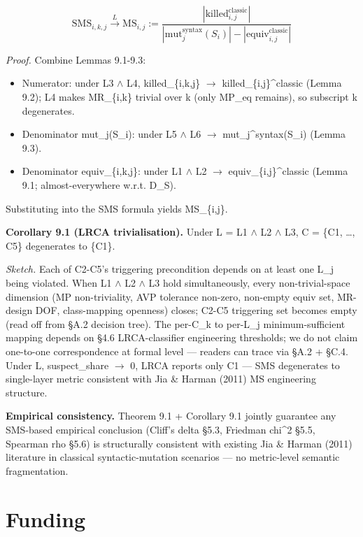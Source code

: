 \documentclass[review,12pt,authoryear]{elsarticle}
\providecommand{\tightlist}{\setlength{\itemsep}{0pt}\setlength{\parskip}{0pt}}
\begin{document}
\[ \mathrm{SMS}_{i,k,j} \xrightarrow{L} \mathrm{MS}_{i,j} := \frac{|\mathrm{killed}_{i,j}^{\mathrm{classic}}|}{|\mathrm{mut}_j^{\mathrm{syntax}}(S_i)| - |\mathrm{equiv}_{i,j}^{\mathrm{classic}}|} \]

\emph{Proof.} Combine Lemmas 9.1-9.3:

\begin{itemize}
\tightlist
\item
  Numerator: under L3 $\wedge$ L4, killed\_\{i,k,j\} $\to$
  killed\_\{i,j\}\^{}classic (Lemma 9.2); L4 makes MR\_\{i,k\} trivial
  over k (only MP\_eq remains), so subscript k degenerates.
\item
  Denominator \textbar mut\_j(S\_i)\textbar: under L5 $\wedge$ L6 $\to$
  \textbar mut\_j\^{}syntax(S\_i)\textbar{} (Lemma 9.3).
\item
  Denominator \textbar equiv\_\{i,k,j\}\textbar: under L1 $\wedge$ L2 $\to$
  \textbar equiv\_\{i,j\}\^{}classic\textbar{} (Lemma 9.1;
  almost-everywhere w.r.t. D\_S).
\end{itemize}

Substituting into the SMS formula yields MS\_\{i,j\}.

\textbf{Corollary 9.1 (LRCA trivialisation).} Under L = L1 $\wedge$ L2 $\wedge$ L3, C
= \{C1, \ldots, C5\} degenerates to \{C1\}.

\emph{Sketch.} Each of C2-C5's triggering precondition depends on at
least one L\_j being violated. When L1 $\wedge$ L2 $\wedge$ L3 hold simultaneously,
every non-trivial-space dimension (MP non-triviality, AVP tolerance
non-zero, non-empty equiv set, MR-design DOF, class-mapping openness)
closes; C2-C5 triggering set becomes empty (read off from §A.2 decision
tree). The per-C\_k to per-L\_j minimum-sufficient mapping depends on
§4.6 LRCA-classifier engineering thresholds; we do not claim one-to-one
correspondence at formal level --- readers can trace via §A.2 + §C.4.
Under L, suspect\_share $\to$ 0, LRCA reports only C1 --- SMS degenerates to
single-layer metric consistent with Jia \& Harman (2011) MS engineering
structure.

\textbf{Empirical consistency.} Theorem 9.1 + Corollary 9.1 jointly
guarantee any SMS-based empirical conclusion (Cliff's delta §5.3,
Friedman chi\^{}2 §5.5, Spearman rho §5.6) is structurally consistent
with existing Jia \& Harman (2011) literature in classical
syntactic-mutation scenarios --- no metric-level semantic fragmentation.

\section*{Funding}
\end{document}
